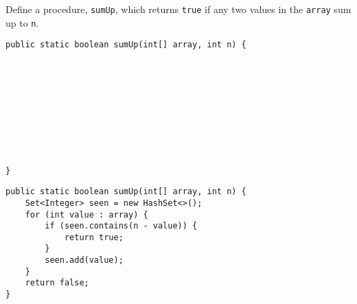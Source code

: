 \begin{blocksection}
\question Define a procedure, \lstinline$sumUp$, which returns \lstinline$true$
if any two values in the \lstinline$array$ sum up to \lstinline$n$.

\ifprintanswers\else
\begin{lstlisting}
public static boolean sumUp(int[] array, int n) {










}
\end{lstlisting}
\fi

\begin{solution}
\begin{lstlisting}
public static boolean sumUp(int[] array, int n) {
    Set<Integer> seen = new HashSet<>();
    for (int value : array) {
        if (seen.contains(n - value)) {
            return true;
        }
        seen.add(value);
    }
    return false;
}
\end{lstlisting}
\end{solution}
\end{blocksection}

